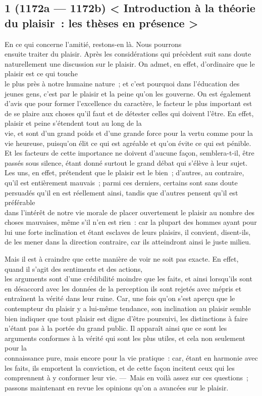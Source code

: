\documentclass[french,twoside]{book} %
\begin{document}
\subsection[{1 (1172a — 1172b) < Introduction à la théorie du plaisir : les thèses en présence >}]{1 (1172a — 1172b) < Introduction à la théorie du plaisir : les thèses en présence >}
\noindent En ce qui concerne l’amitié, restons-en là. Nous pourrons \\
ensuite traiter du plaisir. Après les considérations qui précèdent suit sans doute naturellement une discussion sur le plaisir. On admet, en effet, d’ordinaire que le plaisir est ce qui touche \\
le plus près à notre humaine nature ; et c’est pourquoi dans l’éducation des jeunes gens, c’est par le plaisir et la peine qu’on les gouverne. On est également d’avis que pour former l’excellence du caractère, le facteur le plus important est de se plaire aux choses qu’il faut et de détester celles qui doivent l’être. En effet, plaisir et peine s’étendent tout au long de la \\
vie, et sont d’un grand poids et d’une grande force pour la vertu comme pour la vie heureuse, puisqu’on élit ce qui est agréable et qu’on évite ce qui est pénible. Et les facteurs de cette importance ne doivent d’aucune façon, semblera-t-il, être passés sous silence, étant donné surtout le grand débat qui s’élève à leur sujet. Les uns, en effet, prétendent que le plaisir est le bien ; d’autres, au contraire, qu’il est entièrement mauvais ; parmi ces derniers, certains sont sans doute persuadés qu’il en est réellement ainsi, tandis que d’autres pensent qu’il est préférable \\
dans l’intérêt de notre vie morale de placer ouvertement le plaisir au nombre des choses mauvaises, même s’il n’en est rien : car la plupart des hommes ayant pour lui une forte inclination et étant esclaves de leurs plaisirs, il convient, disent-ils, de les mener dans la direction contraire, car ils atteindront ainsi le juste milieu.\par
Mais il est à craindre que cette manière de voir ne soit pas exacte. En effet, quand il s’agit des sentiments et des actions, \\
les arguments sont d’une crédibilité moindre que les faits, et ainsi lorsqu’ils sont en désaccord avec les données de la perception ils sont rejetés avec mépris et entraînent la vérité dans  leur ruine. Car, une fois qu’on s’est aperçu que le contempteur du plaisir y a lui-même tendance, son inclination au plaisir semble bien indiquer que tout plaisir est digne d’être poursuivi, les distinctions à faire n’étant pas à la portée du grand public. Il apparaît ainsi que ce sont les arguments conformes à la vérité qui sont les plus utiles, et cela non seulement pour la \\
connaissance pure, mais encore pour la vie pratique : car, étant en harmonie avec les faits, ils emportent la conviction, et de cette façon incitent ceux qui les comprennent à y conformer leur vie. — Mais en voilà assez sur ces questions ; passons maintenant en revue les opinions qu’on a avancées sur le plaisir.
\end{document}
